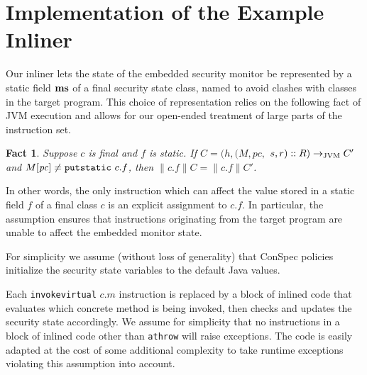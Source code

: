 \documentclass[10pt,twocolumn]{article}
\newtheorem{fact}{Fact}
\newcommand{\MS}{{\bf ms}}
\newcommand{\PC}{\mathit{pc}}
\newcommand{\transJVM}{\rightarrow_{\mbox{\scriptsize{JVM}}}}
\newcommand{\Sem}[1]{\mbox{$\parallel$}{{#1}}\mbox{$\parallel$}}
\begin{document}




\clearpage
\appendix

\section{Implementation of the Example Inliner}\label{app:example_inliner}
Our inliner lets the state of the embedded security monitor be represented by a static field $\MS$ of a final security state class, named to avoid clashes with classes in the target program. This choice of representation relies on the following fact of JVM execution and allows for our open-ended treatment of large parts of the instruction set.
\begin{fact}\label{fact:putstatic}
Suppose $c$ is final and $f$ is static. If $C=(h, (M, \PC,$ $s,r)::R)\transJVM C'$ and $M[\PC] \neq {\tt putstatic}\ c.f$, then $\Sem{c.f}C = \Sem{c.f}C'$.
\end{fact}
In other words, the only instruction which can affect the value stored in a static field $f$ of a final class $c$ is an explicit assignment to $c.f$. In particular, the assumption ensures that instructions originating from the target program are unable to affect the embedded monitor state.

For simplicity we assume (without loss of generality) that ConSpec policies initialize the security state variables to the default Java values.

Each {\tt invokevirtual} $c.m$ instruction is replaced by a block of inlined code that evaluates which concrete method is being invoked, then checks and updates the security state accordingly. We assume for simplicity that no instructions in a block of inlined code other than {\tt athrow} will raise exceptions. The code is easily adapted at the cost of some additional complexity to take runtime exceptions violating this assumption into account. 
\end{document}
